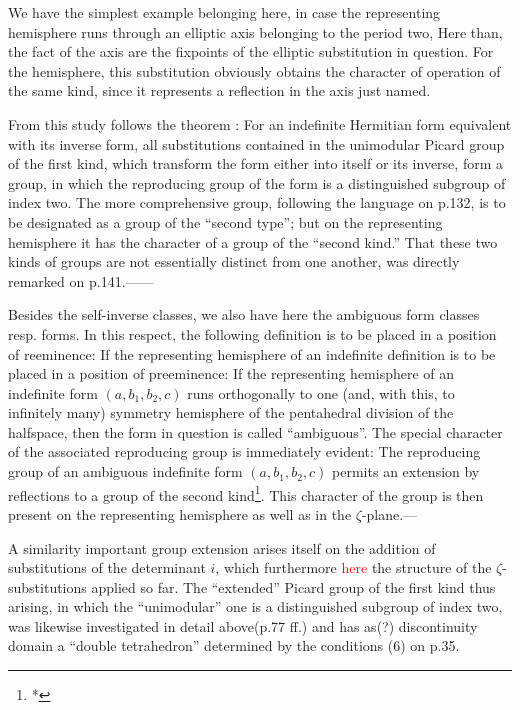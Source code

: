 We have the simplest example belonging here, in case the representing hemisphere runs through an elliptic axis belonging to the period two, Here than, the fact of the axis are the fixpoints of the elliptic substitution in question. For the hemisphere, this substitution obviously obtains the character of operation of the same kind, since it represents a reflection in the axis just named. 

From this study follows the theorem : For an indefinite Hermitian form equivalent with its inverse form, all substitutions contained in the unimodular Picard group of the first kind, which transform the form either into itself or its inverse, form a group, in which the reproducing group of the form is a distinguished subgroup of index two. The more comprehensive group, following the language on p.132, is to be designated as a group of the “second type”; but on the representing hemisphere it has the character of a group of the “second kind.” That these two kinds of groups are not essentially distinct from one another, was directly remarked on p.141.——

Besides the self-inverse classes, we also have here the ambiguous form classes resp. forms. In this respect, the following definition is to be placed in a position of reeminence: If the representing hemisphere of an indefinite definition is to be placed in a position of preeminence: If the representing hemisphere of an indefinite form $(a,b_1,b_2,c)$ runs orthogonally to one (and, with this, to infinitely many) symmetry hemisphere of the pentahedral division of the halfspace, then the form in  question is called “ambiguous”. The special character of the associated reproducing group is immediately evident: The reproducing group of an ambiguous indefinite form $(a,b_1,b_2,c)$ permits an extension by reflections to a group of the second kind\footnote{*}. This character of the group is then present on the representing hemisphere as well as in the $\zeta$-plane.---
 
A similarity important group extension arises itself on the addition of substitutions of the determinant $i$, which furthermore \textcolor{red}{here} the structure of the $\zeta$-substitutions applied so far. The “extended” Picard group of the first kind thus arising, in which the “unimodular” one is a distinguished subgroup of index two, was likewise investigated in detail above(p.77 ff.) and has as(?) discontinuity domain a “double tetrahedron” determined by the conditions (6) on p.35.


